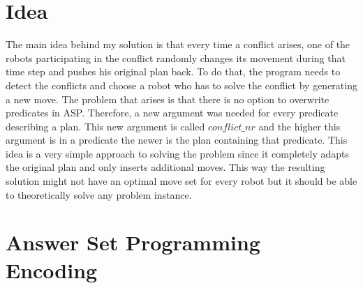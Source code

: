 \documentclass[runningheads]{llncs}
\begin{document}
\section{Idea}
The main idea behind my solution is that every time a conflict arises, one of the robots participating in the conflict randomly changes its movement during that time step and pushes his original plan back. 
To do that, the program needs to detect the conflicts and choose a robot who has to solve the conflict by generating a new move. The problem that arises is that
there is no option to overwrite predicates in ASP. Therefore, a new argument was needed for every predicate describing a plan. This new argument is called $conflict\_nr$ and 
the higher this argument is in a predicate the newer is the plan containing that predicate. This idea is a very simple approach to solving the problem since it completely adapts the original plan and only
inserts additional moves. This way the resulting solution might not have an optimal move set for every robot but it should be able to theoretically solve any problem instance.

\section{Answer Set Programming Encoding}
\end{document}
